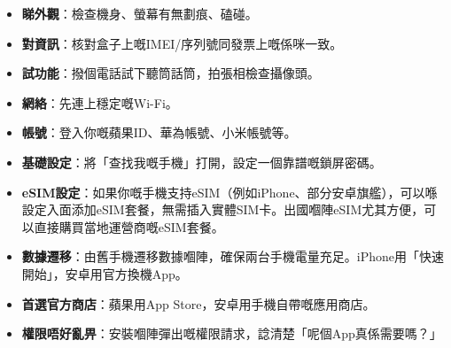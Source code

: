 

\begin{itemize}
  \item \textbf{睇外觀}：檢查機身、螢幕有無劃痕、磕碰。
  \item \textbf{對資訊}：核對盒子上嘅IMEI/序列號同發票上嘅係咪一致。
  \item \textbf{試功能}：撥個電話試下聽筒話筒，拍張相檢查攝像頭。
\end{itemize}


\begin{itemize}
  \item \textbf{網絡}：先連上穩定嘅Wi-Fi。
  \item \textbf{帳號}：登入你嘅蘋果ID、華為帳號、小米帳號等。
  \item \textbf{基礎設定}：將「查找我嘅手機」打開，設定一個靠譜嘅鎖屏密碼。
  \item \textbf{eSIM設定}：如果你嘅手機支持eSIM（例如iPhone、部分安卓旗艦），可以喺設定入面添加eSIM套餐，無需插入實體SIM卡。出國嗰陣eSIM尤其方便，可以直接購買當地運營商嘅eSIM套餐。
  \item \textbf{數據遷移}：由舊手機遷移數據嗰陣，確保兩台手機電量充足。iPhone用「快速開始」，安卓用官方換機App。
\end{itemize}


\begin{itemize}
  \item \textbf{首選官方商店}：蘋果用App Store，安卓用手機自帶嘅應用商店。
  \item \textbf{權限唔好亂畀}：安裝嗰陣彈出嘅權限請求，諗清楚「呢個App真係需要嗎？」
\end{itemize}
